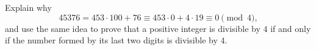 Explain why
\[
45376=453\cdot100+76\equiv453\cdot0+4\cdot19\equiv0\pmod4,
\]
and use the same idea to prove that a positive integer is divisible by $4$ if and only if the number formed by its last two digits is divisible by $4$.
